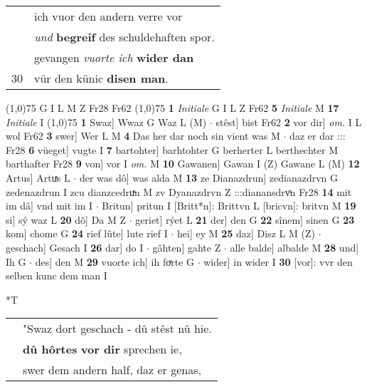 \documentclass[8pt,a4paper,notitlepage]{article}
\begin{document}
\begin{table}[ht]
\begin{minipage}[t]{0.5\linewidth}
\begin{tabular}{rl}
 & ich vuor den andern verre vor\\ 
 & \textit{und} \textbf{begreif} des schuldehaften spor.\\ 
 & gevangen \textit{vuorte ich} \textbf{wider dan}\\ 
30 & vür den künic \textbf{disen man}.\\ 
\end{tabular}
\scriptsize
\line(1,0){75} \newline
G I L M Z Fr28 Fr62 \newline
\line(1,0){75} \newline
\textbf{1} \textit{Initiale} G I L Z Fr62  \textbf{5} \textit{Initiale} M  \textbf{17} \textit{Initiale} I  \newline
\line(1,0){75} \newline
\textbf{1} Swaz] Wwaz G Waz L (M)  $\cdot$ stêst] bist Fr62 \textbf{2} vor dir] \textit{om.} I L wol Fr62 \textbf{3} swer] Wer L M \textbf{4} Das her dar noch sin vient was M  $\cdot$ daz er dar ::: Fr28 \textbf{6} vüeget] vugte I \textbf{7} bartohter] barhtohter G berherter L berthechter M barthafter Fr28 \textbf{9} von] vor I \textit{om.} M \textbf{10} Gawanen] Gawan I (Z) Gawane L (M) \textbf{12} Artus] Artuͯs L  $\cdot$ der was dô] was alda M \textbf{13} ze Dianazdrun] zedianazdrvn G zedenazdrun I zcu dianzcedruͯn M zv Dyanazdrvn Z :::dianansdrvͦn Fr28 \textbf{14} mit im dâ] vnd mit im I  $\cdot$ Britun] pritun I [Britt*n]: Brittvn L [bricvn]: britvn M \textbf{19} si] sý waz L \textbf{20} dô] Da M Z  $\cdot$ geriet] rýet L \textbf{21} der] den G \textbf{22} sînem] sinen G \textbf{23} kom] chome G \textbf{24} rief lûte] lute rief I  $\cdot$ hei] ey M \textbf{25} daz] Disz L M (Z)  $\cdot$ geschach] Gesach I \textbf{26} dar] do I  $\cdot$ gâhten] gahte Z  $\cdot$ alle balde] albalde M \textbf{28} und] Ih G  $\cdot$ des] den M \textbf{29} vuorte ich] ih foͮrte G  $\cdot$ wider] in wider I \textbf{30} [vor]: vvr den selben kunc dem man I \newline
\end{minipage}
\hspace{0.5cm}
\begin{minipage}[t]{0.5\linewidth}
\small
\begin{center}*T
\end{center}
\begin{tabular}{rl}
 & "Swaz dort geschach - dû stêst nû hie.\\ 
 & \textbf{dû hôrtes} \textbf{vor dir} sprechen ie,\\ 
 & swer dem andern half, daz er genas,\\ 

\end{tabular}
\end{minipage}
\end{table}
\end{document}
